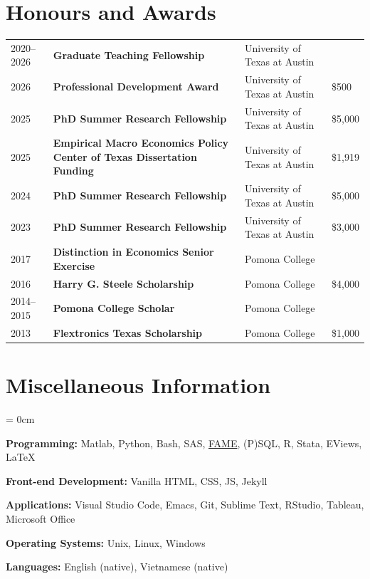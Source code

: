 \documentclass[a4paper, 10pt]{article}
\begin{document}
  \section{Honours and Awards}
  \begin{tabular}{p{1.6cm} p{6.2cm} p{4.2cm} p{0.95cm}}
    2020--2026 & \textbf{Graduate Teaching Fellowship} & University of Texas at Austin &\\
    2026 & \textbf{Professional Development Award} & University of Texas at Austin & \$500\\
    2025 & \textbf{PhD Summer Research Fellowship} & University of Texas at Austin & \$5,000\\
    2025 & \textbf{Empirical Macro Economics Policy \newline Center of Texas Dissertation Funding} & University of Texas at Austin & \$1,919\\
    2024 & \textbf{PhD Summer Research Fellowship} & University of Texas at Austin & \$5,000\\
    2023 & \textbf{PhD Summer Research Fellowship} & University of Texas at Austin & \$3,000\\
    2017 & \textbf{Distinction in Economics Senior Exercise} & Pomona College &\\
    2016 & \textbf{Harry G. Steele Scholarship} & Pomona College & \$4,000\\
    2014--2015 & \textbf{Pomona College Scholar} & Pomona College &\\
    2013 & \textbf{Flextronics Texas Scholarship} & Pomona College & \$1,000
  \end{tabular}

  \section{Miscellaneous Information}
  \begin{compactitem}\parskip = 0cm
    \item \textbf{Programming:} Matlab, Python, Bash, SAS, \href{https://en.wikipedia.org/wiki/FAME_(database)}{FAME}, (P)SQL, R, Stata, EViews, \LaTeX
    \item \textbf{Front-end Development:} Vanilla HTML, CSS, JS, Jekyll
    \item \textbf{Applications:} Visual Studio Code, Emacs, Git, Sublime Text, RStudio, Tableau, Microsoft Office
    \item \textbf{Operating Systems:} Unix, Linux, Windows
    \item \textbf{Languages:} English (native), Vietnamese (native)
  \end{compactitem}
\end{document}
